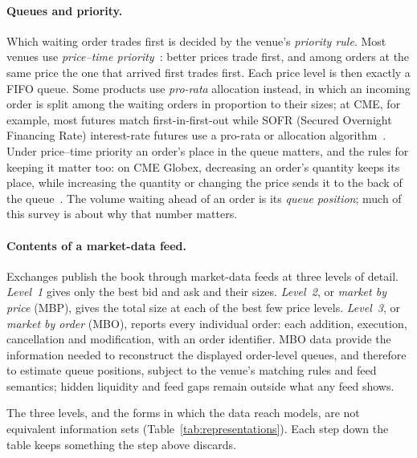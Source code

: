 \paragraph{Queues and priority.}
Which waiting order trades first is decided by the venue's \emph{priority rule}. Most venues use
\emph{price--time priority}~\citep{harris2003}: better prices trade first, and among orders at the same price the one
that arrived first trades first. Each price level is then exactly a FIFO queue. Some products use
\emph{pro-rata} allocation instead, in which an incoming order is split among the waiting orders in
proportion to their sizes; at CME, for example, most futures match first-in-first-out while SOFR (Secured Overnight Financing Rate)
interest-rate futures use a pro-rata or allocation algorithm~\citep{cme_matching}. Under
price--time priority an order's place in the queue matters, and the rules for keeping it matter
too: on CME Globex, decreasing an order's quantity keeps its place, while increasing the quantity
or changing the price sends it to the back of the queue~\citep{cme_matching}. The volume waiting
ahead of an order is its \emph{queue position}; much of this survey is about why that number
matters.

\paragraph{Contents of a market-data feed.}
Exchanges publish the book through market-data feeds at three levels of detail. \emph{Level~1}
gives only the best bid and ask and their sizes. \emph{Level~2}, or \emph{market by price} (MBP),
gives the total size at each of the best few price levels. \emph{Level~3}, or \emph{market by
order} (MBO), reports every individual order: each addition, execution, cancellation and
modification, with an order identifier. MBO data provide the information needed to
reconstruct the displayed order-level queues, and therefore to estimate queue positions, subject to the
venue's matching rules and feed semantics; hidden liquidity and feed gaps remain outside what any feed
shows.

The three levels, and the forms in which the data reach models, are not equivalent information sets
(Table~\ref{tab:representations}). Each step down the table keeps something the step above discards.

